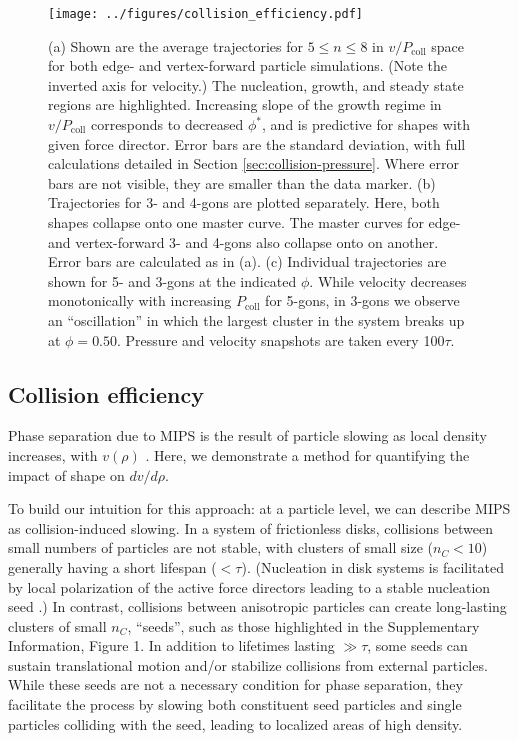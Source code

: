\begin{figure*}[t]
\begin{center}
\texttt{[image: ../figures/collision\_efficiency.pdf]}
\caption{
(a)
Shown are the average trajectories for $5{\leq}n{\leq}8$ in $v/P_\text{coll}$ space for both edge- and vertex-forward particle simulations.
(Note the inverted axis for velocity.)
The nucleation, growth, and steady state regions are highlighted.
Increasing slope of the growth regime in $v/P_\text{coll}$ corresponds to decreased $\phi^*$, and is predictive for shapes with given force director.
Error bars are the standard deviation, with full calculations detailed in Section \ref{sec:collision-pressure}.
Where error bars are not visible, they are smaller than the data marker.
(b)
Trajectories for 3- and 4-gons are plotted separately.
Here, both shapes collapse onto one master curve.
The master curves for edge- and vertex-forward 3- and 4-gons also collapse onto on another.
Error bars are calculated as in (a).
(c)
Individual trajectories are shown for 5- and 3-gons at the indicated $\phi$.
While velocity decreases monotonically with increasing $P_\text{coll}$ for 5-gons, in 3-gons we observe an ``oscillation'' in which the largest cluster in the system breaks up at $\phi=0.50$.
Pressure and velocity snapshots are taken every 100$\tau$.
}
\label{fig:pressure}
\end{center}
\end{figure*}

\subsection{Collision efficiency}
\label{sec:collision_efficiency}

Phase separation due to MIPS is the result of particle slowing as local density increases, with $v(\rho)$ \cite{Cates_2013_EPL}.
Here, we demonstrate a method for quantifying the impact of shape on ${dv}/{d\rho}$.

To build our intuition for this approach: at a particle level, we can describe MIPS as collision-induced slowing.
In a system of frictionless disks, collisions between small numbers of particles are not stable, with clusters of small size ($n_C<10$) generally having a short lifespan ($<\tau$).
(Nucleation in disk systems is facilitated by local polarization of the active force directors leading to a stable nucleation seed \cite{Redner_2016_PRL,Richard_2016_SoftMatter}.)
In contrast, collisions between anisotropic particles can create long-lasting clusters of small $n_C$, ``seeds'', such as those highlighted in the Supplementary Information, Figure 1.
In addition to lifetimes lasting $\gg\tau$, some seeds can sustain translational motion and/or stabilize collisions from external particles.
While these seeds are not a necessary condition for phase separation, they facilitate the process by slowing both constituent seed particles and single particles colliding with the seed, leading to localized areas of high density.


